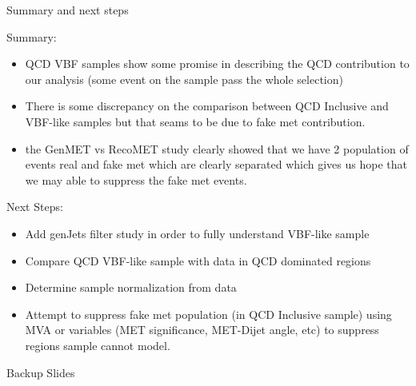\documentclass[8pt]{beamer}
\begin{document}
\begin{frame}{Summary and next steps}
 
\begin{block}{Summary:}
 
\begin{itemize}
  \item QCD VBF samples show some promise in describing the QCD contribution to our analysis (some event on the sample pass the whole selection)
  \item There is some discrepancy on the comparison between QCD Inclusive and VBF-like samples but that seams to be due to fake met contribution.
  \item the GenMET vs RecoMET study clearly showed that we have 2 population of events real and fake met which are clearly separated which gives us hope that we may able to suppress the fake met events.
\end{itemize}

\end{block}

\begin{block}{Next Steps:}
 
\begin{itemize}
 \item Add genJets filter study in order to fully understand VBF-like sample
 \item Compare QCD VBF-like sample with data in QCD dominated regions
 \item Determine sample normalization from data
 \item Attempt to suppress fake met population (in QCD Inclusive sample) using MVA or variables (MET significance, MET-Dijet angle, etc) to suppress regions sample cannot model.
\end{itemize}
 
\end{block}

\end{frame}


\appendix
\begin{frame}
 
\begin{block}

\begin{center}Backup Slides\end{center}

\end{block}

\end{frame}
\end{document}
